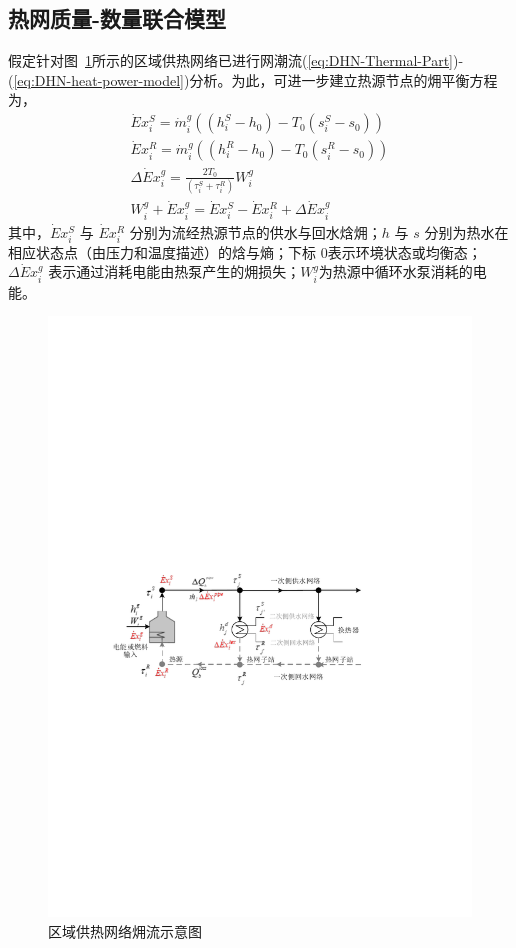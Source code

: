 \subsection{热网质量-数量联合模型}
\label{sec:DHN-Exergy-Model}
假定针对图~\ref{Fig:DHN-Topology-Exergy}所示的区域供热网络已进行网潮流(\ref{eq:DHN-Thermal-Part})-(\ref{eq:DHN-heat-power-model})分析。为此，可进一步建立热源节点的㶲平衡方程为，
\begin{subequations}
\label{eq:exergy-heat-source}
\begin{gather}
\dot Ex_i^S = {{\dot m}_i^g}{(({h_i^S - {h_0}}) - {T_0}({s_i^S - {s_0}}))}\\
\dot Ex_i^R = {{\dot m}_i^g}{(({h_i^R - {h_0}}) - {T_0}({s_i^R - {s_0}}))} \\
\Delta \dot Ex_i^g = \frac{{2{T_0}}}{{\left( {\tau_i^S + \tau_i^R} \right)}}W_i^g\\
W_i^g + \dot Ex_i^g = \dot Ex_i^S - \dot Ex_i^R + \Delta \dot Ex_i^g
\end{gather}
\end{subequations}
其中，$\dot Ex_i^S$ 与 $\dot Ex_i^R$ 分别为流经热源节点的供水与回水焓㶲；$h$ 与 $s$ 分别为热水在相应状态点（由压力和温度描述）的焓与熵；下标 0表示环境状态或均衡态；$\Delta \dot Ex_i^g$ 表示通过消耗电能由热泵产生的㶲损失；$W_i^g$为热源中循环水泵消耗的电能。

\begin{figure}[H]
\centering
\includegraphics[scale=0.79]{figures/chap4-4-DHN-Exergy-Model-V2.pdf}
\caption{区域供热网络㶲流示意图}
\label{Fig:DHN-Topology-Exergy}
\end{figure}

